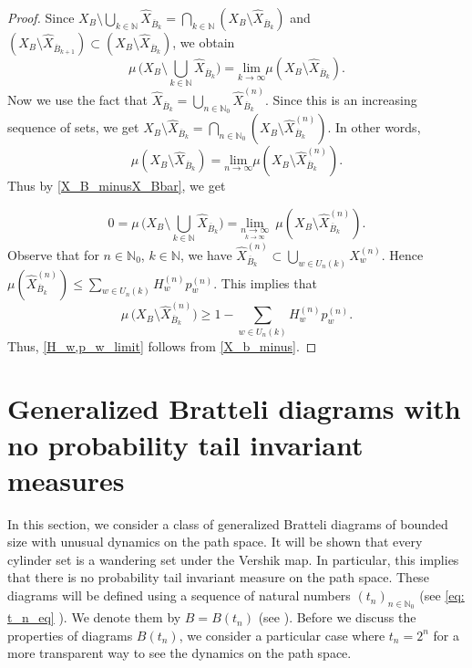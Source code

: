 \documentclass[11pt,reqno]{amsart}
\theoremstyle{definition}
\theoremstyle{remark}
\theoremstyle{plain}
\def\ov{\overline}
\def\wh{\widehat}
\newcommand{\N}{\mathbb N}
\numberwithin{equation}{section}
\begin{document}
\begin{proof} Since $X_B \setminus \underset{k \in \N}{\bigcup} \wh{X}_{\ov{B}_k} = \underset{k \in \N}{ \bigcap} (X_B \setminus \wh{X}_{\ov{B}_k})$ and $(X_B \setminus \wh{X}_{\ov{B}_{k+1}}) \subset (X_B \setminus \wh{X}_{\ov{B}_k})$, we obtain
\begin{equation}\label{X_B_minusX_Bbar}
    \mu \, \big(X_B \setminus \underset{k \in \N}{\bigcup} \wh{X}_{\ov{B}_k} \big) = \underset{k \rightarrow \infty}{\textrm{lim}} \mu (X_B \setminus \wh{X}_{\ov{B}_k}). 
\end{equation} Now we use the fact that $\wh{X}_{\ov{B}_k} = \underset{n \in \N_0}{\bigcup} \wh{X}^{(n)}_{\ov{B}_k}$. Since this is an increasing sequence of sets, we get $X_B \setminus \wh{X}_{\ov{B}_k} = \underset{n \in \N_0}{\bigcap} (X_B \setminus \wh{X}^{(n)}_{\ov{B}_k})$. In other words,
\[
\mu (X_B \setminus \wh{X}_{\ov{B}_k}) =  \underset{n \rightarrow \infty}{\textrm{lim}} \mu (X_B \setminus \wh{X}^{(n)}_{\ov{B}_k}).
\] Thus by \eqref{X_B_minusX_Bbar}, we get

\begin{equation}\label{X_b_minus}
    0=\mu \, \big(X_B \setminus \underset{k \in \N}{\bigcup} \wh{X}_{\ov{B}_k} \big) = \underset{ \underset{k \rightarrow \infty}{ n \rightarrow \infty}}{\mathrm{lim}} \,\,\, \mu (X_B \setminus \wh{X}^{(n)}_{\ov{B}_k}).
\end{equation}
Observe that for $n \in \N_0$, $k \in \N$, we have $\wh{X}^{(n)}_{\ov{B}_k} \subset \underset{w \in U_n(k)}{\bigcup} X_w^{(n)}$. Hence $\mu(\wh{X}^{(n)}_{\ov{B}_k} ) \leq \underset{w \in U_n(k)}{\sum} H_w^{(n)}p_w^{(n)}$. This implies that
\[
\mu \, \big(X_B \setminus \wh{X}^{(n)}_{\ov{B}_k} \big) \geq 1 - \underset{w \in U_n(k)}{\sum} H_w^{(n)}p_w^{(n)}.
\] 
Thus, \eqref{H_w,p_w_limit} follows from \eqref{X_b_minus}.  

\end{proof}

\section{Generalized Bratteli diagrams with no probability tail invariant measures}\label{sect B(2^k)} 

In this section, we consider a class of generalized Bratteli diagrams of bounded size with unusual dynamics on the path space. It will be shown that every cylinder set is a wandering set under the Vershik map.
In particular, this implies that there is no probability tail invariant measure on the path space. These diagrams will be defined using a sequence of natural numbers $(t_n)_{n \in \N_0}$ (see \eqref{eq: t_n_eq} ). We denote them by $B = B(t_n)$ (see ). Before we discuss the properties of diagrams $B(t_n)$, we consider a particular case where $t_n = 2^n$ for a more transparent way to see the dynamics on the path space.
\end{document}
